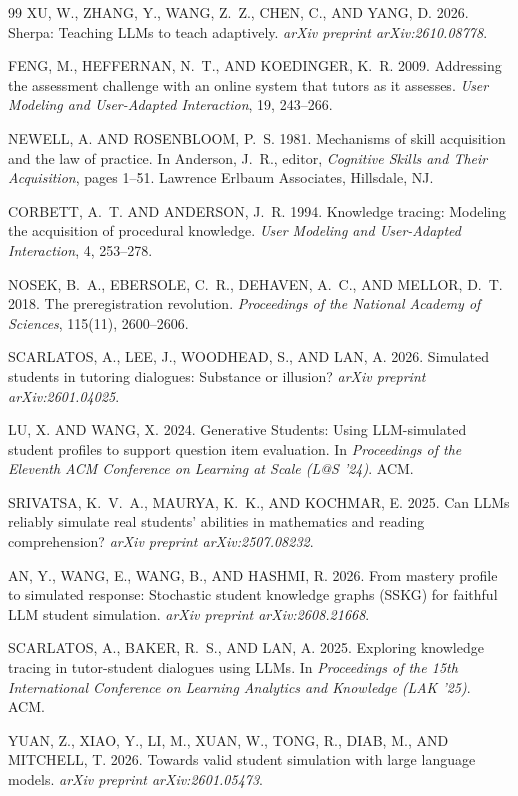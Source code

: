 \documentclass[notitlepage,12pt]{jedm}
\begin{document}
\begin{thebibliography}{99}
XU, W., ZHANG, Y., WANG, Z.~Z., CHEN, C., AND YANG, D. 2026.
\newblock Sherpa: Teaching LLMs to teach adaptively.
\newblock \emph{arXiv preprint arXiv:2610.08778}.

FENG, M., HEFFERNAN, N.~T., AND KOEDINGER, K.~R. 2009.
\newblock Addressing the assessment challenge with an online system that tutors
  as it assesses.
\newblock \emph{User Modeling and User-Adapted Interaction}, 19, 243--266.

NEWELL, A. AND ROSENBLOOM, P.~S. 1981.
\newblock Mechanisms of skill acquisition and the law of practice.
\newblock In Anderson, J.~R., editor, \emph{Cognitive Skills and Their
  Acquisition}, pages 1--51. Lawrence Erlbaum Associates, Hillsdale, NJ.

CORBETT, A.~T. AND ANDERSON, J.~R. 1994.
\newblock Knowledge tracing: Modeling the acquisition of procedural knowledge.
\newblock \emph{User Modeling and User-Adapted Interaction}, 4, 253--278.

NOSEK, B.~A., EBERSOLE, C.~R., DEHAVEN, A.~C., AND MELLOR, D.~T. 2018.
\newblock The preregistration revolution.
\newblock \emph{Proceedings of the National Academy of Sciences}, 115(11),
  2600--2606.

SCARLATOS, A., LEE, J., WOODHEAD, S., AND LAN, A. 2026.
\newblock Simulated students in tutoring dialogues: Substance or illusion?
\newblock \emph{arXiv preprint arXiv:2601.04025}.

LU, X. AND WANG, X. 2024.
\newblock Generative Students: Using LLM-simulated student profiles to support
  question item evaluation.
\newblock In \emph{Proceedings of the Eleventh ACM Conference on Learning at
  Scale (L@S '24)}. ACM.

SRIVATSA, K.~V.~A., MAURYA, K.~K., AND KOCHMAR, E. 2025.
\newblock Can LLMs reliably simulate real students' abilities in mathematics
  and reading comprehension?
\newblock \emph{arXiv preprint arXiv:2507.08232}.

AN, Y., WANG, E., WANG, B., AND HASHMI, R. 2026.
\newblock From mastery profile to simulated response: Stochastic student
  knowledge graphs (SSKG) for faithful LLM student simulation.
\newblock \emph{arXiv preprint arXiv:2608.21668}.

SCARLATOS, A., BAKER, R.~S., AND LAN, A. 2025.
\newblock Exploring knowledge tracing in tutor-student dialogues using LLMs.
\newblock In \emph{Proceedings of the 15th International Conference on
  Learning Analytics and Knowledge (LAK '25)}. ACM.

YUAN, Z., XIAO, Y., LI, M., XUAN, W., TONG, R., DIAB, M., AND MITCHELL, T. 2026.
\newblock Towards valid student simulation with large language models.
\newblock \emph{arXiv preprint arXiv:2601.05473}.
\end{thebibliography}
\end{document}
